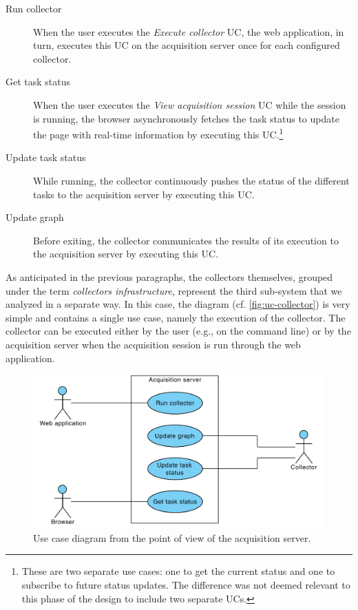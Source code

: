 \begin{description}
  \item[Run collector] When the user executes the \emph{Execute collector} UC, the web application, in turn, executes this UC on the acquisition server once for each configured collector.
  \item[Get task status] When the user executes the \emph{View acquisition session} UC while the session is running, the browser asynchronously fetches the task status to update the page with real-time information by executing this UC.\footnote{These are two separate use cases: one to get the current status and one to subscribe to future status updates. The difference was not deemed relevant to this phase of the design to include two separate UCs.}
  \item[Update task status] While running, the collector continuously pushes the status of the different tasks to the acquisition server by executing this UC.
  \item[Update graph] Before exiting, the collector communicates the results of its execution to the acquisition server by executing this UC.
\end{description}

As anticipated in the previous paragraphs, the collectors themselves, grouped under the term \emph{collectors infrastructure}, represent the third sub-system that we analyzed in a separate way. In this case, the diagram (cf. \vref{fig:uc-collector}) is very simple and contains a single use case, namely the execution of the collector. The collector can be executed either by the user (e.g., on the command line) or by the acquisition server when the acquisition session is run through the web application.

\begin{figure}[p]
  \centering
  \includegraphics[width=0.75\linewidth]{images/diagrams/uc-server}
  \caption[Use case diagram for the acquisition server.]{Use case diagram from the point of view of the acquisition server.}
  \label{fig:uc-server}
\end{figure}

